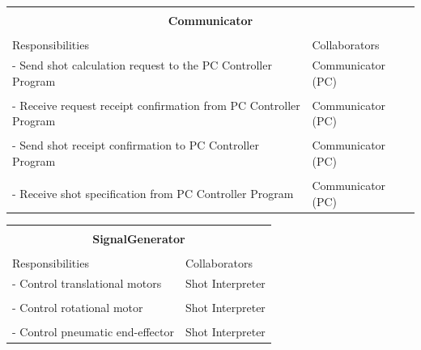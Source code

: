 \documentclass[titlepage]{article}
\begin{document}
\begin{table}[!htbp]
\centering
\begin{tabular}{| p{} | p{} |}\hline
	\multicolumn{2}{|l|}{}\\
	\multicolumn{2}{|c|}{\large{\textbf{Communicator}}}\\
	\multicolumn{2}{|l|}{}\\\hline
	\vspace{0mm}\large{Responsibilities}\vspace{2mm} &\vspace{0mm}\large{Collaborators}\vspace{2mm}\\\hline
	\vspace{0mm}- Send shot calculation request to the PC Controller Program	&\vspace{0mm}Communicator (PC)\\&\\
	- Receive request receipt confirmation from PC Controller Program			&Communicator (PC)\\&\\
	- Send shot receipt confirmation to PC Controller Program					&Communicator (PC)\\&\\
	- Receive shot specification from PC Controller Program\vspace{2mm}			&Communicator (PC)\vspace{2mm}\\\hline
\end{tabular}
\end{table}

\begin{table}[!htbp]
\centering
\begin{tabular}{| p{} | p{} |}\hline
	\multicolumn{2}{|l|}{}\\
	\multicolumn{2}{|c|}{\large{\textbf{SignalGenerator}}}\\
	\multicolumn{2}{|l|}{}\\\hline
	\vspace{0mm}\large{Responsibilities}\vspace{2mm} &\vspace{0mm}\large{Collaborators}\vspace{2mm}\\\hline
	\vspace{0mm}- Control translational motors		&\vspace{0mm}Shot Interpreter\\&\\
	- Control rotational motor						&Shot Interpreter\\&\\
	- Control pneumatic end-effector\vspace{2mm}	&Shot Interpreter\vspace{2mm}\\\hline
\end{tabular}
\end{table}
\newpage
\end{document}
